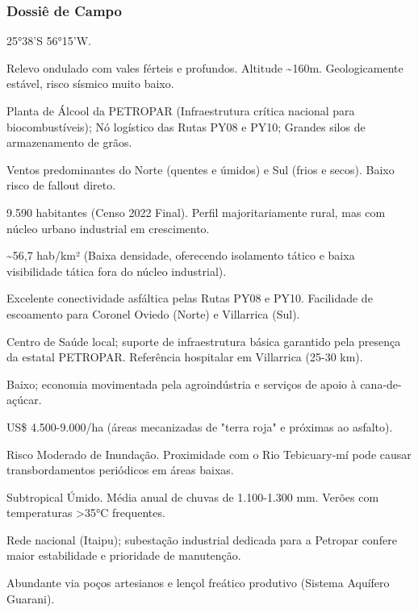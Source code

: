 \subsubsection{Dossiê de Campo}
\begin{description}[style=nextline,leftmargin=0.5cm,font=\bfseries]
\item[Coordenadas]  25°38'S 56°15'W.
\item[Topografia]  Relevo ondulado com vales férteis e profundos. Altitude \textasciitilde 160m. Geologicamente estável, risco sísmico muito baixo.
\item[Alvos Estratégicos]  Planta de Álcool da PETROPAR (Infraestrutura crítica nacional para biocombustíveis); Nó logístico das Rutas PY08 e PY10; Grandes silos de armazenamento de grãos.
\item[Fallout]  Ventos predominantes do Norte (quentes e úmidos) e Sul (frios e secos). Baixo risco de fallout direto.
\item[População]  9.590 habitantes (Censo 2022 Final). Perfil majoritariamente rural, mas com núcleo urbano industrial em crescimento.
\item[Densidade]  \textasciitilde 56,7 hab/\allowbreak km² (Baixa densidade, oferecendo isolamento tático e baixa visibilidade tática fora do núcleo industrial).
\item[Vias de Acesso]  Excelente conectividade asfáltica pelas Rutas PY08 e PY10. Facilidade de escoamento para Coronel Oviedo (Norte) e Villarrica (Sul).
\item[Serviços]  Centro de Saúde local; suporte de infraestrutura básica garantido pela presença da estatal PETROPAR. Referência hospitalar em Villarrica (25-30 km).
\item[Custo de Vida]  Baixo; economia movimentada pela agroindústria e serviços de apoio à cana-de-açúcar.
\item[Preço da Terra]  US\$ 4.500-9.000/\allowbreak ha (áreas mecanizadas de "terra roja" e próximas ao asfalto).
\item[Hidrologia]  Risco Moderado de Inundação. Proximidade com o Rio Tebicuary-mí pode causar transbordamentos periódicos em áreas baixas.
\item[Clima]  Subtropical Úmido. Média anual de chuvas de 1.100-1.300 mm. Verões com temperaturas >35°C frequentes.
\item[Energia]  Rede nacional (Itaipu); subestação industrial dedicada para a Petropar confere maior estabilidade e prioridade de manutenção.
\item[Água]  Abundante via poços artesianos e lençol freático produtivo (Sistema Aquífero Guarani).

\end{description}
